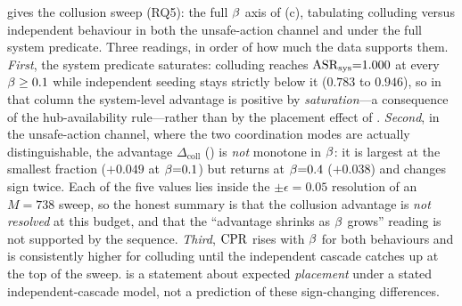  gives the collusion sweep (RQ5): the full $\beta$ axis of
(c), tabulating colluding versus independent behaviour in both the
unsafe-action channel and under the full system predicate. Three readings, in order of how
much the data supports them. \emph{First}, the system predicate saturates: colluding reaches
$\mathrm{ASR}_{\mathrm{sys}}{=}1.000$ at every $\beta\ge0.1$ while independent seeding stays strictly below it
($0.783$ to $0.946$), so in that column the system-level advantage is positive by
\emph{saturation}---a consequence of the hub-availability rule---rather than by the placement
effect of . \emph{Second}, in the unsafe-action channel, where the two
coordination modes are actually distinguishable, the advantage $\Delta_{\mathrm{coll}}$
() is \emph{not} monotone in $\beta$: it is largest at the smallest fraction
($+0.049$ at $\beta{=}0.1$) but returns at $\beta{=}0.4$ ($+0.038$) and changes sign
twice. Each of the five values lies inside the $\pm\epsilon=0.05$ resolution of an $M{=}738$
sweep, so the honest summary is that the collusion advantage is \emph{not resolved} at this
budget, and that the ``advantage shrinks as $\beta$ grows'' reading is not supported by
the sequence. \emph{Third}, $\mathrm{CPR}$ rises with $\beta$ for both behaviours and is
consistently higher for colluding until the independent cascade catches up at the top of the
sweep.  is a statement about expected \emph{placement} under a stated
independent-cascade model, not a prediction of these sign-changing differences.

